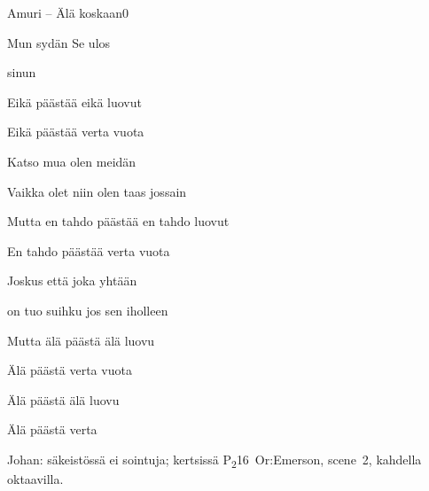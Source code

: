 \documentclass[12pt,a4paper]{article}
\begin{document}
\thispagestyle{empty}
\begin{mysong}{Amuri – Älä koskaan}{0}


\begin{SBVerse}
  Mun sydän  Se    ulos
   

      sinun 
\end{SBVerse}

\begin{SBChorus}
  Eikä  päästää  eikä 
  luovut

  Eikä  päästää   verta
  vuota
\end{SBChorus}


\begin{SBVerse}
  Katso mua  olen    meidän
   

  Vaikka olet  niin   
  olen taas jossain  
\end{SBVerse}

\begin{SBChorus}
  Mutta en  tahdo päästää  en 
  tahdo luovut

  En  tahdo päästää   verta
  vuota
\end{SBChorus}


\begin{SBVerse}
  Joskus  että   joka 
  yhtään  

  on tuo  suihku  jos sen
   iholleen  
\end{SBVerse}

\begin{SBChorus}
  Mutta älä  päästä  älä 
  luovu

  Älä  päästä   verta
  vuota

  Älä  päästä  älä 
  luovu

  Älä  päästä   verta
\end{SBChorus}


{\SBLyricNoteFont Johan: säkeistössä ei sointuja; kertsissä
P\textsubscript{2}16~Or:Emerson, scene~2, kahdella oktaavilla.}

\end{mysong}
\end{document}
